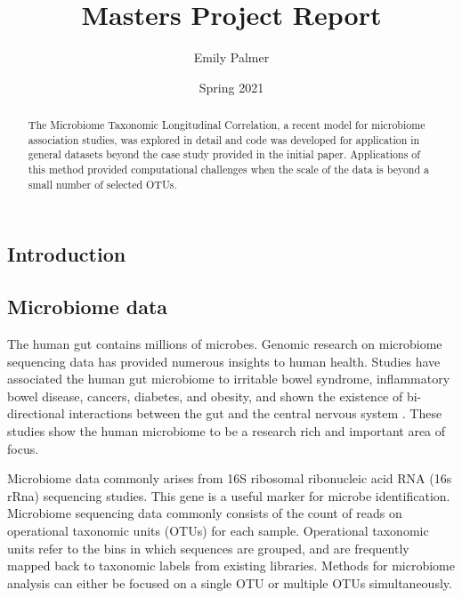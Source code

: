 \documentclass[12pt]{article}
\title{Masters Project Report}
\author{Emily Palmer}
\date{Spring 2021}
\begin{document}
\maketitle

\begin{abstract}
  The Microbiome Taxonomic Longitudinal Correlation, a recent model for microbiome association studies, was explored in detail and code was developed for application in general datasets beyond the case study provided in the initial paper. Applications of this method provided computational challenges when the scale of the data is beyond a small number of selected OTUs.
\end{abstract}


\begin{singlespace}
\section{Introduction}
\end{singlespace}

\subsection{Microbiome data}
The human gut contains millions of microbes. Genomic research on microbiome sequencing data has provided numerous insights to human health. Studies have associated the human gut microbiome to irritable bowel syndrome, inflammatory bowel disease, cancers, diabetes, and obesity, and shown the existence of bi-directional interactions  between the gut and the central nervous system \cite{kinross2008human, mayer2015gut}. These studies show the human microbiome to be a research rich and important area of focus.


Microbiome data commonly arises from 16S ribosomal ribonucleic acid RNA (16s rRna) sequencing studies. This gene is a useful marker for microbe identification.  Microbiome sequencing data commonly consists of the count of reads on operational taxonomic units (OTUs) for each sample. Operational taxonomic units refer to the bins in which sequences are grouped, and are frequently mapped back to taxonomic labels from existing libraries. Methods for microbiome analysis can either be focused on a single OTU or multiple OTUs simultaneously.
\end{document}
